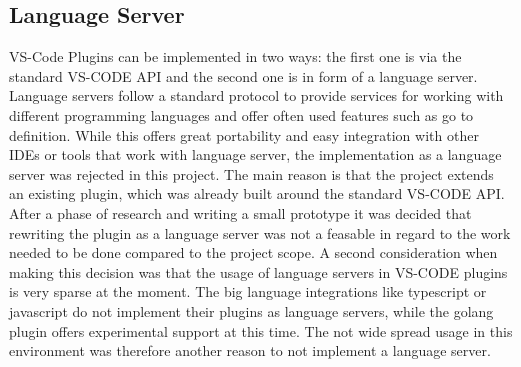 \subsection{Language Server}

VS-Code Plugins can be implemented in two ways: the first one is via the standard VS-CODE API and the second one is in form of a language server. Language servers follow a standard protocol to provide services for working with different programming languages and offer often used features such as go to definition. While this offers great portability and easy integration with other IDEs or tools that work with language server, the implementation as a language server was rejected in this project. \newline
The main reason is that the project extends an existing plugin, which was already built around the standard VS-CODE API. After a phase of research and writing a small prototype it was decided that rewriting the plugin as a language server was not a feasable in regard to the work needed to be done compared to the project scope. \newline
A second consideration when making this decision was that the usage of language servers in VS-CODE plugins is very sparse at the moment. The big language integrations like typescript or javascript do not implement their plugins as language servers, while the golang plugin offers experimental support at this time. The not wide spread usage in this environment was therefore another reason to not implement a language server.
